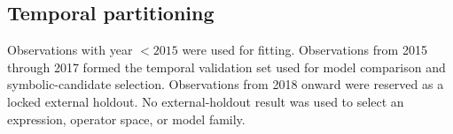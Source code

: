 \subsection{Temporal partitioning}
Observations with year $<2015$ were used for fitting. Observations from 2015 through 2017 formed the temporal validation set used for model comparison and symbolic-candidate selection. Observations from 2018 onward were reserved as a locked external holdout. No external-holdout result was used to select an expression, operator space, or model family.
